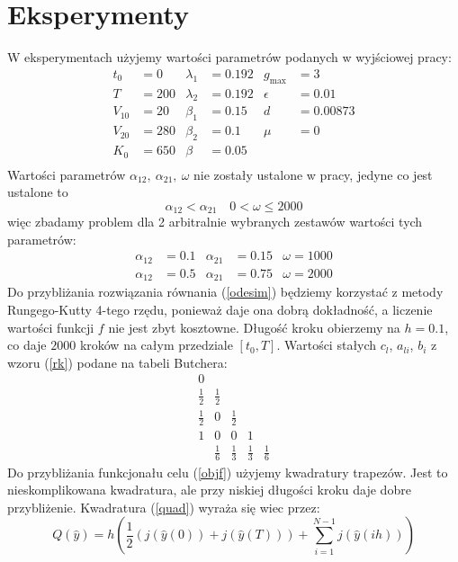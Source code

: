 \documentclass[11pt]{article}
\begin{document}
\section{Eksperymenty}
W eksperymentach użyjemy wartości parametrów podanych w wyjściowej pracy:
\begin{align*}
  t_0 &= 0          & \lambda_1 &= 0.192 & g_{\max} &= 3    \\
  T &= 200          & \lambda_2 &= 0.192 & \epsilon &= 0.01 \\
  V_{10} &= 20      & \beta_1 &= 0.15    & d &= 0.00873     \\
  V_{20} &= 280     & \beta_2 &= 0.1     & \mu &= 0         \\
  K_0 &= 650        & \beta &= 0.05      &       &          \\
\end{align*}
Wartości parametrów $\alpha_{12},\ \alpha_{21},\ \omega$ nie zostały ustalone w pracy, jedyne co jest ustalone to
\[ \alpha_{12} < \alpha_{21}\quad 0 < \omega \le 2000 \]
więc zbadamy problem dla 2 arbitralnie wybranych zestawów wartości tych parametrów:
\begin{align}\label{exp1}
  \alpha_{12} &= 0.1 & \alpha_{21} &= 0.15 & \omega = 1000
\end{align}
\begin{align}\label{exp2}
  \alpha_{12} &= 0.5 & \alpha_{21} &= 0.75 & \omega = 2000
\end{align}
Do przybliżania rozwiązania równania (\ref{odesim}) będziemy korzystać z metody Rungego-Kutty 4-tego rzędu, ponieważ daje ona dobrą dokładność, a liczenie wartości funkcji $f$ nie jest zbyt kosztowne. Długość kroku obierzemy na $h = 0.1$, co daje $2000$ kroków na całym przedziale $[t_0, T]$. Wartości stałych $c_l$, $a_{li}$, $b_i$ z wzoru (\ref{rk}) podane na tabeli Butchera:
\begin{equation}\label{butcher}
  \begin{array}
    {c|cccc}
    0\\
    \frac{1}{2} & \frac{1}{2}\\
    \frac{1}{2} &0 &\frac{1}{2} \\
    1& 0& 0& 1\\
    \hline{}
    & \frac{1}{6} &\frac{1}{3} &\frac{1}{3} &\frac{1}{6} 
  \end{array}
\end{equation}
Do przybliżania funkcjonału celu (\ref{objf}) użyjemy kwadratury trapezów. Jest to nieskomplikowana kwadratura, ale przy niskiej długości kroku daje dobre przybliżenie. Kwadratura (\ref{quad}) wyraża się wiec przez:
\begin{equation} \label{trapezoidal}
  Q(\hat{y}) = h\left(\frac{1}{2}(j(\hat{y}(0)) + j(\hat{y}(T))) + \sum_{i=1}^{N-1} j(\hat{y}(ih))\right)
\end{equation}
\end{document}
